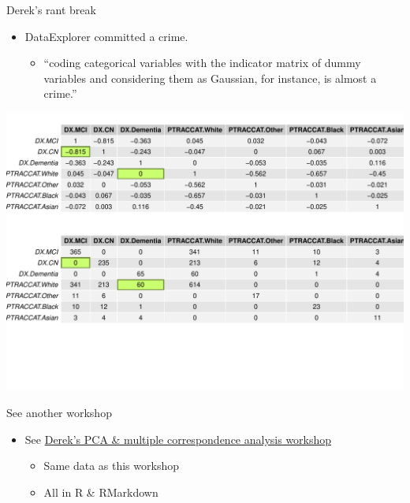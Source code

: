 \documentclass[
  ignorenonframetext,
]{beamer}
\providecommand{\tightlist}{%
  \setlength{\itemsep}{0pt}\setlength{\parskip}{0pt}}
\begin{document}
\begin{frame}{Derek's rant break}
\protect\hypertarget{dereks-rant-break}{}

\begin{itemize}
\tightlist
\item
  DataExplorer committed a crime.

  \begin{itemize}
  \tightlist
  \item
    ``coding categorical variables with the indicator matrix of dummy
    variables and considering them as Gaussian, for instance, is almost
    a crime.''
  \end{itemize}
\end{itemize}

\includegraphics{../external/images/categorical_nonsense.pdf}

\end{frame}

\begin{frame}{See another workshop}
\protect\hypertarget{see-another-workshop}{}

\begin{itemize}
\tightlist
\item
  See
  \href{https://github.com/derekbeaton/Workshops/tree/master/RTC/PCA_MCA_Resampling/}{Derek's
  PCA \& multiple correspondence analysis workshop}

  \begin{itemize}
  \tightlist
  \item
    Same data as this workshop
  \item
    All in R \& RMarkdown
  \end{itemize}
\end{itemize}

\end{frame}
\end{document}
